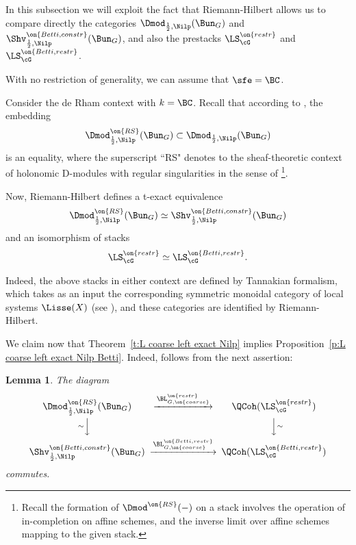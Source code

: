 \documentclass[9pt]{amsart}
\newtheorem{lem}[subsubsection]{Lemma}
\theoremstyle{remark}
\theoremstyle{definition}
\theoremstyle{remark}
\newcommand{\thmref}[1]{Theorem~\ref{#1}}
\newcommand{\propref}[1]{Proposition~\ref{#1}}
\numberwithin{equation}{section}
\begin{document}
In this subsection we will exploit the fact that Riemann-Hilbert allows us to compare directly the categories
$\Dmod_{\frac{1}{2},\Nilp}(\Bun_G)$ and $\Shv^{\on{Betti,constr}}_{\frac{1}{2},\Nilp}(\Bun_G)$, 
and also the prestacks $\LS^{\on{restr}}_\cG$ and $\LS^{\on{Betti,restr}}_\cG$.

\sssec{Proof of \propref{p:L coarse left exact Nilp Betti}}

With no restriction of generality, we can assume that $\sfe=\BC$. 

\medskip

Consider the de Rham context with $k=\BC$. Recall that according to \cite[Corollary 16.5.6]{AGKRRV}, the embedding
$$\Dmod^{\on{RS}}_{\frac{1}{2},\Nilp}(\Bun_G) \subset \Dmod_{\frac{1}{2},\Nilp}(\Bun_G)$$ 
is an equality, where the superscript ``RS" denotes to the sheaf-theoretic context of holonomic D-modules
with regular singularities in the sense of \cite[Sect. 1.1.1]{AGKRRV}\footnote{Recall the 
formation of $\Dmod^{\on{RS}}(-)$ on a stack involves the operation of in-completion on affine schemes, and
the inverse limit over affine schemes mapping to the given stack.}. 

\medskip

Now, Riemann-Hilbert defines a t-exact equivalence
$$\Dmod^{\on{RS}}_{\frac{1}{2},\Nilp}(\Bun_G) \simeq \Shv^{\on{Betti,constr}}_{\frac{1}{2},\Nilp}(\Bun_G)$$
and an isomorphism of stacks
$$\LS^{\on{restr}}_\cG\simeq \LS^{\on{Betti,restr}}_\cG.$$

Indeed, the above stacks in either context are defined by Tannakian formalism, which takes as an input the 
corresponding symmetric monoidal category of local systems $\Lisse(X)$ (see \cite[Sect. 1.2]{AGKRRV}),
and these categories are identified by Riemann-Hilbert.

\medskip

We claim now that  \thmref{t:L coarse left exact Nilp} implies 
\propref{p:L coarse left exact Nilp Betti}. Indeed, follows from the next assertion: 

\begin{lem} 
The diagram 
\begin{equation} \label{e:RH diag coarse}
\CD
\Dmod^{\on{RS}}_{\frac{1}{2},\Nilp}(\Bun_G)  @>{\BL_{G,\on{coarse}}^{\on{restr}}}>>  \QCoh(\LS^{\on{restr}}_\cG) \\
@V{\sim}VV @VV{\sim}V \\
\Shv^{\on{Betti,constr}}_{\frac{1}{2},\Nilp}(\Bun_G) @>{\BL_{G,\on{coarse}}^{\on{Betti,restr}}}>> \QCoh(\LS^{\on{Betti,restr}}_\cG)
\endCD
\end{equation}
commutes. 
\end{lem} 
\end{document}
